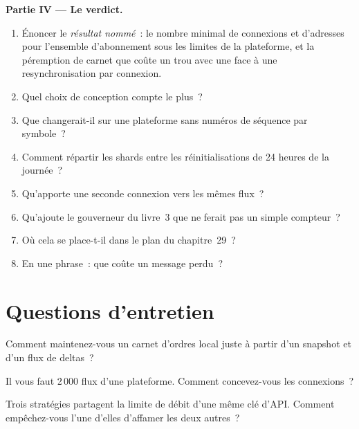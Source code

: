 \begin{problem}
\medskip\noindent\textbf{Partie IV --- Le verdict.}
\begin{enumerate}[resume]
\item Énoncer le \emph{résultat nommé}~: le nombre minimal de connexions et d'adresses pour l'ensemble d'abonnement sous les limites de la plateforme, et la péremption de carnet que coûte un
  trou avec une  face à une resynchronisation par connexion.
\item Quel choix de conception compte le plus~?
\item Que changerait-il sur une plateforme sans numéros de séquence par symbole~?
\item Comment répartir les shards entre les réinitialisations de 24 heures de la journée~?
\item Qu'apporte une seconde connexion vers les mêmes flux~?
\item Qu'ajoute le gouverneur du livre~3 que ne ferait pas un simple compteur~?
\item Où cela se place-t-il dans le plan du chapitre~29~?
\item En une phrase~: que coûte un message perdu~?
\end{enumerate}
\end{problem}

\section{Questions d'entretien}

\begin{interviewq}\label{iq:nw:api-engineering-for-crypto-venues:1}
Comment maintenez-vous un carnet d'ordres local juste à partir d'un snapshot et d'un flux de deltas~?
\end{interviewq}

\begin{interviewq}\label{iq:nw:api-engineering-for-crypto-venues:2}
Il vous faut 2\,000 flux d'une plateforme. Comment concevez-vous les connexions~?
\end{interviewq}

\begin{interviewq}\label{iq:nw:api-engineering-for-crypto-venues:3}
Trois stratégies partagent la limite de débit d'une même clé d'API. Comment empêchez-vous l'une d'elles d'affamer les deux autres~?
\end{interviewq}

